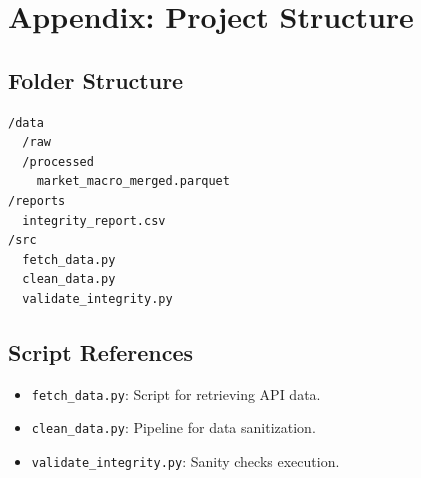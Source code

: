 \documentclass[a4paper,fleqn]{cas-sc}
\begin{document}
\appendix
\section{Appendix: Project Structure}

\subsection{Folder Structure}
\begin{verbatim}
/data
  /raw
  /processed
    market_macro_merged.parquet
/reports
  integrity_report.csv
/src
  fetch_data.py
  clean_data.py
  validate_integrity.py
\end{verbatim}

\subsection{Script References}
\begin{itemize}
    \item \texttt{fetch\_data.py}: Script for retrieving API data.
    \item \texttt{clean\_data.py}: Pipeline for data sanitization.
    \item \texttt{validate\_integrity.py}: Sanity checks execution.
\end{itemize}

 
\end{document}
